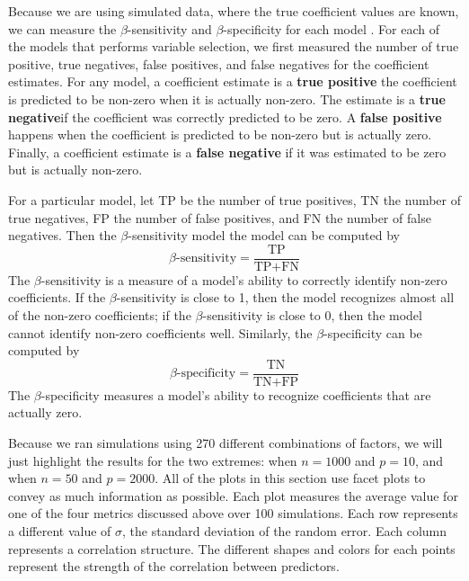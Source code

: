 \documentclass{article}
\begin{document}
Because we are using simulated data, where the true coefficient values are known, we can measure the $\beta$-sensitivity and $\beta$-specificity for each model \cite{liu2020logsum}. For each of the models that performs variable selection, we first measured the number of true positive, true negatives, false positives, and false negatives for the coefficient estimates. For any model, a coefficient estimate is a \textbf{true positive} the coefficient is predicted to be non-zero when it is actually non-zero. The estimate is a \textbf{true negative}if the coefficient was correctly predicted to be zero. A \textbf{false positive} happens when the coefficient is predicted to be non-zero but is actually zero. Finally, a coefficient estimate is a \textbf{false negative} if it was estimated to be zero but is actually non-zero.

For a particular model, let TP be the number of true positives, TN the number of true negatives, FP the number of false positives, and FN the number of false negatives. Then the $\beta$-sensitivity model the model can be computed by
\begin{equation}
	\beta\text{-sensitivity} = \frac{\text{TP}}{\text{TP} + \text{FN}}
\end{equation}
The $\beta$-sensitivity is a measure of a model's ability to correctly identify non-zero coefficients. If the $\beta$-sensitivity is close to 1, then the model recognizes almost all of the non-zero coefficients; if the $\beta$-sensitivity is close to 0, then the model cannot identify non-zero coefficients well. Similarly, the $\beta$-specificity can be computed by
\begin{equation}
	\beta\text{-specificity} = \frac{\text{TN}}{\text{TN} + \text{FP}}
\end{equation}
The $\beta$-specificity measures a model's ability to recognize coefficients that are actually zero.


Because we ran simulations using 270 different combinations of factors, we will just highlight the results for the two extremes: when $n = 1000$ and $p = 10$, and when $n = 50$ and $p = 2000$. All of the plots in this section use facet plots to convey as much information as possible. Each plot measures the average value for one of the four metrics discussed above over 100 simulations. Each row represents a different value of $\sigma$, the standard deviation of the random error. Each column represents a correlation structure. The different shapes and colors for each points represent the strength of the correlation between predictors.
\end{document}
